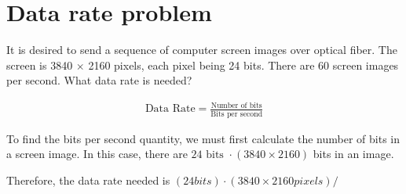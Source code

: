 
\section{Data rate problem}
It is desired to send a sequence of computer screen images over optical fiber. The screen is 3840 $\times$ 2160 pixels, each pixel being 24 bits. There are 60 screen images per second. What data rate is needed?

\begin{align*}
	\text{Data Rate} = \frac{\text{Number of bits}}{\text{Bits per second}}
\end{align*}

To find the bits per second quantity, we must first calculate the number of bits in a screen image. In this case, there are $24 \text{ bits } \cdot (3840 \times 2160)$ bits in an image.

Therefore, the data rate needed is $(24 bits) \cdot (3840 \times 2160 pixels) / $

\section{}
\section{}
\section{}
\section{}
\section{}
\section{}

